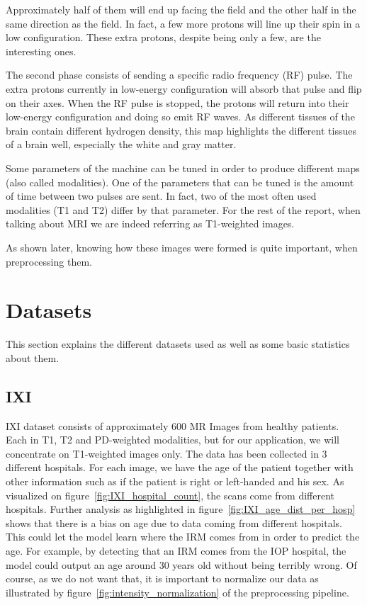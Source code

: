 Approximately half of them will end up facing the field and the other half in the same direction as the field. In fact, a few more protons will line up their spin in a low configuration. These extra protons, despite being only a few, are the interesting ones.

The second phase consists of sending a specific radio frequency (RF) pulse. The extra protons currently in low-energy configuration will absorb that pulse and flip on their axes.  When the RF pulse is stopped, the protons will return into their low-energy configuration and doing so emit RF waves. As different tissues of the brain contain different hydrogen density, this map highlights the different tissues of a brain well, especially the white and gray matter.

Some parameters of the machine can be tuned in order to produce different maps (also called modalities). One of the parameters that can be tuned is the amount of time between two pulses are sent. In fact, two of the most often used modalities (T1 and T2) differ by that parameter. For the rest of the report, when talking about MRI we are indeed referring as T1-weighted images.

As shown later, knowing how these images were formed is quite important, when preprocessing them.

\section{Datasets}
This section explains the different datasets used as well as some basic statistics about them.
\subsection{IXI}
IXI dataset consists of approximately 600 MR Images from healthy patients. Each in T1, T2 and PD-weighted modalities, but for our application, we will concentrate on T1-weighted images only. The data has been collected in 3 different hospitals. For each image, we have the age of the patient together with other information such as if the patient is right or left-handed and his sex. As visualized on figure~\ref{fig:IXI_hospital_count}, the scans come from different hospitals. Further analysis as highlighted in figure~\ref{fig:IXI_age_dist_per_hosp} shows that there is a bias on age due to data coming from different hospitals. This could let the model learn where the IRM comes from in order to predict the age. For example, by detecting that an IRM comes from the IOP hospital, the model could output an age around 30 years old without being terribly wrong. Of course, as we do not want that, it is important to normalize our data as illustrated by figure~\ref{fig:intensity_normalization} of the preprocessing pipeline.

